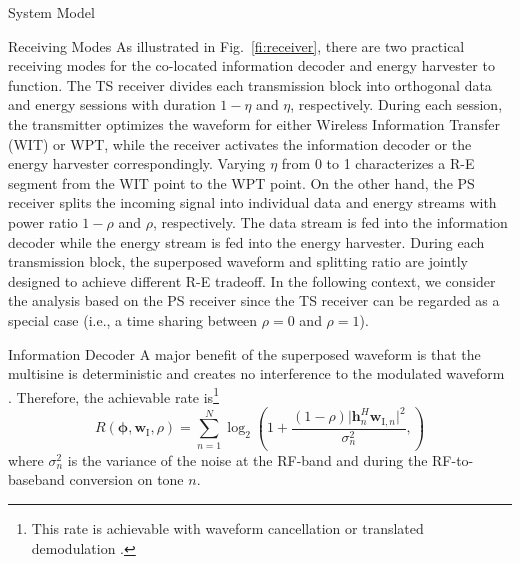 \documentclass[journal]{IEEEtran}
\begin{document}
\begin{section}{System Model}
\begin{subsection}{Receiving Modes}
			As illustrated in Fig.~\ref{fi:receiver}, there are two practical receiving modes for the co-located information decoder and energy harvester \cite{Zhou2013} to function. The TS receiver divides each transmission block into orthogonal data and energy sessions with duration $1-\eta$ and $\eta$, respectively. During each session, the transmitter optimizes the waveform for either Wireless Information Transfer (WIT) or WPT, while the receiver activates the information decoder or the energy harvester correspondingly. Varying $\eta$ from \num{0} to \num{1} characterizes a R-E segment from the WIT point to the WPT point. On the other hand, the PS receiver splits the incoming signal into individual data and energy streams with power ratio $1-\rho$ and $\rho$, respectively. The data stream is fed into the information decoder while the energy stream is fed into the energy harvester. During each transmission block, the superposed waveform and splitting ratio are jointly designed to achieve different R-E tradeoff. In the following context, we consider the analysis based on the PS receiver since the TS receiver can be regarded as a special case (i.e., a time sharing between $\rho=0$ and $\rho=1$).
		\end{subsection}


		\begin{subsection}{Information Decoder}
			A major benefit of the superposed waveform is that the multisine is deterministic and creates no interference to the modulated waveform \cite{Clerckx2018b}. Therefore, the achievable rate is\footnote{This rate is achievable with waveform cancellation or translated demodulation \cite{Clerckx2018b}.}
			\begin{equation}\label{eq:R}
				R(\boldsymbol{\phi},\boldsymbol{w}_{\mathrm{I}},\rho) = \sum_{n=1}^N{\log_2\left(1+\frac{(1-\rho)\lvert \boldsymbol{h}_{n}^H\boldsymbol{w}_{\mathrm{I},n} \rvert^2}{\sigma_n^2},\right)}
			\end{equation}
			where $\sigma_n^2$ is the variance of the noise at the RF-band and during the RF-to-baseband conversion on tone $n$.
		\end{subsection}



\end{section}
\end{document}
